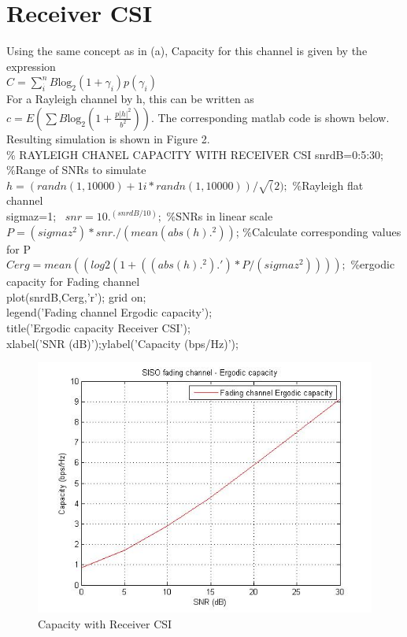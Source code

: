 \documentclass{article}
\begin{document}
\section{Receiver CSI}
Using the same concept as in (a), Capacity for this channel is given by the expression\\ $C=\sum _{\stackrel{.}{i}}^{n}B{\mathrm{log}}_{2}\left(1+{\gamma}_{i}\right)p\left({\gamma}_{i}\right)$ \\For a Rayleigh channel by h, this can be written as\\ $c=E\left(\sum B{\mathrm{log}}_{2}\left(1+\frac{p{\left|h\right|}^{2}}{{b}^{2}}\right)\right)$. The corresponding matlab code is shown below. Resulting simulation is shown in Figure 2.\\

\% RAYLEIGH CHANEL CAPACITY WITH RECEIVER CSI
snrdB=0:5:30; \%Range of SNRs to simulate\\

$h= (randn(1,10000) + 1i*randn(1,10000) )/\sqrt(2);$ \%Rayleigh flat channel\\
sigmaz=1;\ %
$snr = 10.^(snrdB/10);$ \%SNRs in linear scale\\
$P=(sigmaz^2)*snr./(mean(abs(h).^2))$; \%Calculate corresponding values for P\\
$Cerg = mean((log2(1+ ((abs(h).^2).')*P/(sigmaz^2))));$ \%ergodic capacity for Fading channel \\
plot(snrdB,Cerg,'r'); grid on;\\
legend('Fading channel Ergodic capacity');\\
title('Ergodic capacity Receiver CSI');\\
xlabel('SNR (dB)');ylabel('Capacity (bps/Hz)');\\
\begin{figure}
	\centering
	\includegraphics[width=1\linewidth]{RECEIVER_CSI}
	\caption{Capacity with Receiver CSI}
	\label{fig:RECEIVER_CSI}
\end{figure}
\end{document}
